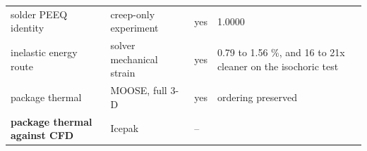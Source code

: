 \documentclass[10pt,]{article}
\begin{document}
\begin{longtable}[]{@{}llll@{}}
\begin{minipage}[t]{0.22\columnwidth}\raggedright
solder PEEQ identity\strut
\end{minipage} & \begin{minipage}[t]{0.22\columnwidth}\raggedright
creep-only experiment\strut
\end{minipage} & \begin{minipage}[t]{0.22\columnwidth}\raggedright
yes\strut
\end{minipage} & \begin{minipage}[t]{0.22\columnwidth}\raggedright
1.0000\strut
\end{minipage}\tabularnewline
\begin{minipage}[t]{0.22\columnwidth}\raggedright
inelastic energy route\strut
\end{minipage} & \begin{minipage}[t]{0.22\columnwidth}\raggedright
solver mechanical strain\strut
\end{minipage} & \begin{minipage}[t]{0.22\columnwidth}\raggedright
yes\strut
\end{minipage} & \begin{minipage}[t]{0.22\columnwidth}\raggedright
0.79 to 1.56 \%, and 16 to 21x cleaner on the isochoric test\strut
\end{minipage}\tabularnewline
\begin{minipage}[t]{0.22\columnwidth}\raggedright
package thermal\strut
\end{minipage} & \begin{minipage}[t]{0.22\columnwidth}\raggedright
MOOSE, full 3-D\strut
\end{minipage} & \begin{minipage}[t]{0.22\columnwidth}\raggedright
yes\strut
\end{minipage} & \begin{minipage}[t]{0.22\columnwidth}\raggedright
ordering preserved\strut
\end{minipage}\tabularnewline
\begin{minipage}[t]{0.22\columnwidth}\raggedright
\textbf{package thermal against CFD}\strut
\end{minipage} & \begin{minipage}[t]{0.22\columnwidth}\raggedright
Icepak\strut
\end{minipage} & \begin{minipage}[t]{0.22\columnwidth}\raggedright
--\strut
\end{minipage} & \begin{minipage}[t]{0.22\columnwidth}\raggedright

\end{minipage}
\end{longtable}
\end{document}
